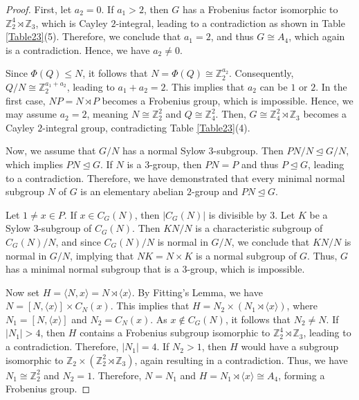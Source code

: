\documentclass{amsart}
\def \leq {\leqslant}
\begin{document}
\begin{proof}
	First, let \( a_2 = 0 \). If \( a_1 > 2 \), then \( G \) has a Frobenius factor isomorphic to \( \mathbb{Z}_2^4 \rtimes \mathbb{Z}_3 \), which is Cayley \( 2 \)-integral, leading to a contradiction as shown in Table \ref{Table23}(5). Therefore, we conclude that \( a_1 = 2 \), and thus \( G \cong A_4 \), which again is a contradiction. Hence, we have \( a_2 \neq 0 \). 
	
	Since \( \Phi(Q) \leq N \), it follows that \( N = \Phi(Q) \cong \mathbb{Z}_2^{a_2} \). Consequently, \( Q/N \cong \mathbb{Z}_2^{a_1 + a_2} \), leading to \( a_1 + a_2 = 2 \). This implies that \( a_2 \) can be \( 1 \) or \( 2 \). In the first case, \( NP = N \rtimes P \) becomes a Frobenius group, which is impossible. Hence, we may assume \( a_2 = 2 \), meaning \( N \cong \mathbb{Z}_2^2 \) and \( Q \cong \mathbb{Z}_4^2 \). Then, \( G \cong \mathbb{Z}_4^2 \rtimes \mathbb{Z}_3 \) becomes a Cayley \( 2 \)-integral group, contradicting Table \ref{Table23}(4). 
	
	Now, we assume that \( G/N \) has a normal Sylow \( 3 \)-subgroup. Then \( PN/N \unlhd G/N \), which implies \( PN \unlhd G \). If \( N \) is a \( 3 \)-group, then \( PN = P \) and thus \( P \unlhd G \), leading to a contradiction. Therefore, we have demonstrated that every minimal normal subgroup \( N \) of \( G \) is an elementary abelian \( 2 \)-group and \( PN \unlhd G \).
	
	Let \( 1 \neq x \in P \). If \( x \in C_G(N) \), then \( |C_G(N)| \) is divisible by \( 3 \). Let \( K \) be a Sylow \( 3 \)-subgroup of \( C_G(N) \). Then \( KN/N \) is a characteristic subgroup of \( C_G(N)/N \), and since \( C_G(N)/N \) is normal in \( G/N \), we conclude that \( KN/N \) is normal in \( G/N \), implying that \( NK = N \times K \) is a normal subgroup of \( G \). Thus, \( G \) has a minimal normal subgroup that is a \( 3 \)-group, which is impossible.
	
	Now set \( H = \langle N, x \rangle = N \rtimes \langle x \rangle \). By  Fitting's Lemma, we have \( N = [N, \langle x \rangle] \times C_N(x) \). This implies that \( H = N_2 \times (N_1 \rtimes \langle x \rangle) \), where \( N_1 = [N, \langle x \rangle] \) and \( N_2 = C_N(x) \). As \( x \notin C_G(N) \), it follows that \( N_2 \neq N \). If \( |N_1| > 4 \), then \( H \) contains a Frobenius subgroup isomorphic to \( \mathbb{Z}_2^4 \rtimes \mathbb{Z}_3 \), leading to a contradiction. Therefore, \( |N_1| = 4 \). If \( N_2 > 1 \), then \( H \) would have a subgroup isomorphic to \( \mathbb{Z}_2 \times( \mathbb{Z}_2^2 \rtimes \mathbb{Z}_3 )\), again resulting in a contradiction. Thus, we have \( N_1 \cong \mathbb{Z}_2^2 \) and \( N_2 = 1 \). Therefore, \( N = N_1 \) and \( H = N_1 \rtimes \langle x \rangle \cong A_4 \), forming a Frobenius group. 
	

\end{proof}
\end{document}
